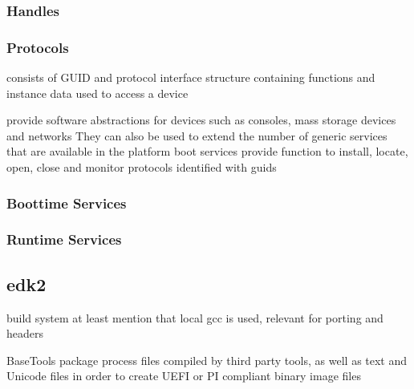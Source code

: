 \subsubsection{Handles}
\cite[7.3 Protocol Handler Services]{uefi-spec}
\subsubsection{Protocols}
consists of GUID and protocol interface structure containing functions and instance data used to access a device

provide software abstractions for devices such as consoles, mass storage devices and networks
They can also be used to extend the number of generic services that are available in the platform
\cite[2.4 Protocols]{uefi-spec}
boot services provide function to install, locate, open, close and monitor protocols
\cite[7.3 Protocol Handler Services]{uefi-spec}
identified with guids
\subsubsection{Boottime Services}
\subsubsection{Runtime Services}


\subsection{edk2}
build system
at least mention that local gcc is used, relevant for porting and headers

BaseTools package process files compiled by third party tools, as well as text and Unicode files in order to create UEFI or PI compliant binary image files
\cite{tianocore-edk2}